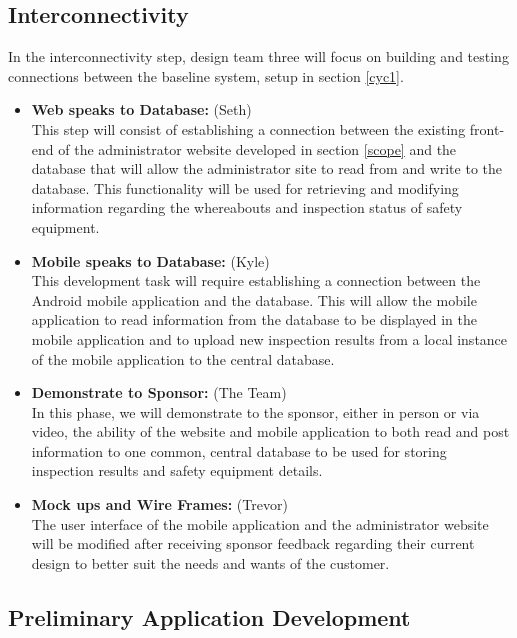 \documentclass[Letter,11pt]{article}
\begin{document}
	\subsection{Interconnectivity}\label{connect}
		In the interconnectivity step, design team three will focus on building and testing connections between the baseline system, setup in section \ref{cyc1}.
		\begin{itemize}
			\item\textbf{Web speaks to Database:} (Seth)\\
			This step will consist of establishing a connection between the existing front-end of the administrator website developed in section \ref{scope} and the database that will allow the administrator site to read from and write to the database.  This functionality will be used for retrieving and modifying information regarding the whereabouts and inspection status of safety equipment. 

			
			\item \textbf{Mobile speaks to Database:} (Kyle)\\
			This development task will require establishing a connection between the Android mobile application and the database.  This will allow the mobile application to read information from the database to be displayed in the mobile application and to upload new inspection results from a local instance of the mobile application to the central database.

			\item\textbf{Demonstrate to Sponsor:} (The Team)\\
			 In this phase, we will demonstrate to the sponsor, either in person or via video, the ability of the website and mobile application to both read and post information to one common, central database to be used for storing inspection results and safety equipment details.

			
			\item\textbf{Mock ups and Wire Frames:} (Trevor)\\
			The user interface of the mobile application and the administrator website will be modified after receiving sponsor feedback regarding their current design to better suit the needs and wants of the customer.
			
			
		\end{itemize}
		
		\subsection{Preliminary Application Development}\label{dev1}
		
\end{document}
